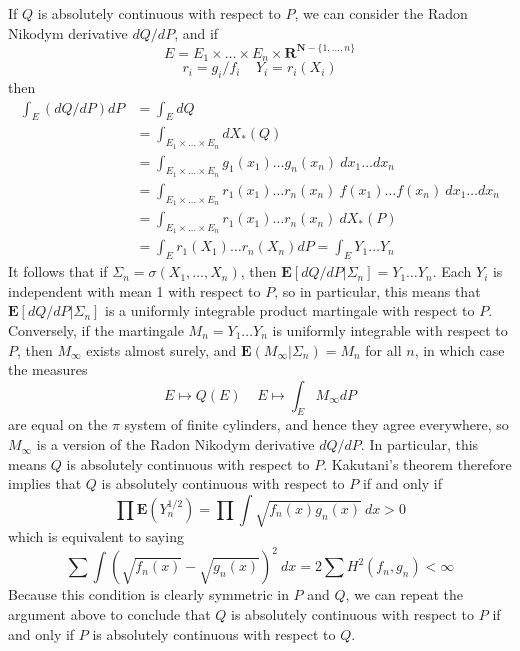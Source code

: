 \begin{example}
If $Q$ is absolutely continuous with respect to $P$, we can consider the Radon Nikodym derivative $dQ/dP$, and if
%
\[ E = E_1 \times \dots \times E_n \times \mathbf{R}^{\mathbf{N} - \{ 1, \dots, n \}} \]
\[ r_i = g_i/f_i\ \ \ \ \ Y_i = r_i(X_i) \]
%
then
%
\begin{align*}
    \int_E (dQ/dP) dP &= \int_E dQ\\
    &= \int_{E_1 \times \dots \times E_n} dX_*(Q)\\
    &= \int_{E_1 \times \dots \times E_n} g_1(x_1) \dots g_n(x_n)\ dx_1 \dots dx_n\\
    &= \int_{E_1 \times \dots \times E_n} r_1(x_1) \dots r_n(x_n)\ f(x_1) \dots f(x_n)\ dx_1 \dots dx_n\\
    &= \int_{E_1 \times \dots \times E_n} r_1(x_1) \dots r_n(x_n)\ dX_*(P)\\
    &= \int_{E} r_1(X_1) \dots r_n(X_n) dP = \int_E Y_1 \dots Y_n
\end{align*}
%
It follows that if $\Sigma_n = \sigma(X_1, \dots, X_n)$, then $\mathbf{E}[dQ/dP|\Sigma_n] = Y_1 \dots Y_n$. Each $Y_i$ is independent with mean 1 with respect to $P$, so in particular, this means that $\mathbf{E}[dQ/dP|\Sigma_n]$ is a uniformly integrable product martingale with respect to $P$. Conversely, if the martingale $M_n = Y_1 \dots Y_n$ is uniformly integrable with respect to $P$, then $M_\infty$ exists almost surely, and $\mathbf{E}(M_\infty|\Sigma_n) = M_n$ for all $n$, in which case the measures
%
\[ E \mapsto Q(E)\ \ \ \ \ E \mapsto \int_E M_\infty dP \]
%
are equal on the $\pi$ system of finite cylinders, and hence they agree everywhere, so $M_\infty$ is a version of the Radon Nikodym derivative $dQ/dP$. In particular, this means $Q$ is absolutely continuous with respect to $P$. Kakutani's theorem therefore implies that $Q$ is absolutely continuous with respect to $P$ if and only if
%
\[ \prod \mathbf{E}(Y_n^{1/2}) = \prod \int \sqrt{f_n(x) g_n(x)}\ dx > 0 \]
%
which is equivalent to saying
%
\[ \sum \int \left( \sqrt{f_n(x)} - \sqrt{g_n(x)} \right)^2\ dx = 2 \sum H^2(f_n,g_n) < \infty \]
%
Because this condition is clearly symmetric in $P$ and $Q$, we can repeat the argument above to conclude that $Q$ is absolutely continuous with respect to $P$ if and only if $P$ is absolutely continuous with respect to $Q$.


\end{example}
